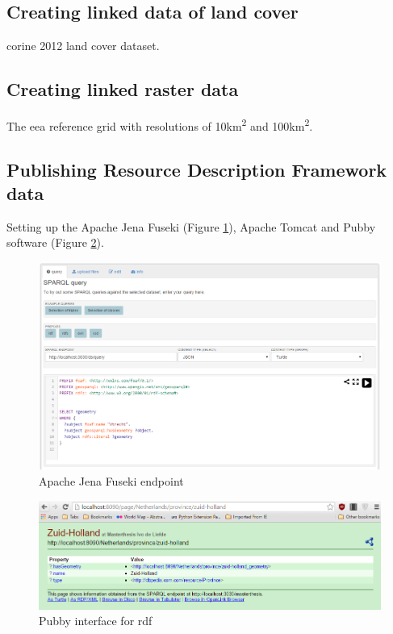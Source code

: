 \subsection{Creating linked data of land cover}
\ac{corine} 2012 land cover dataset. 

\subsection{Creating linked raster data}
The \ac{eea} reference grid with resolutions of 10km\textsuperscript{2} and 100km\textsuperscript{2}.

\subsection{Publishing Resource Description Framework data}
Setting up the Apache Jena Fuseki (Figure \ref{fig:Fuseki}), Apache Tomcat and Pubby software (Figure \ref{fig:Pubby}\textbf{}).

\begin{figure}
	\includegraphics[width=\linewidth]{figs/fuseki.PNG}
	\caption{Apache Jena Fuseki endpoint}
	\label{fig:Fuseki}
\end{figure}

\begin{figure}
	\includegraphics[width=\linewidth]{figs/pubby.PNG}
	\caption{Pubby interface for \ac{rdf}}
	\label{fig:Pubby}
\end{figure}


